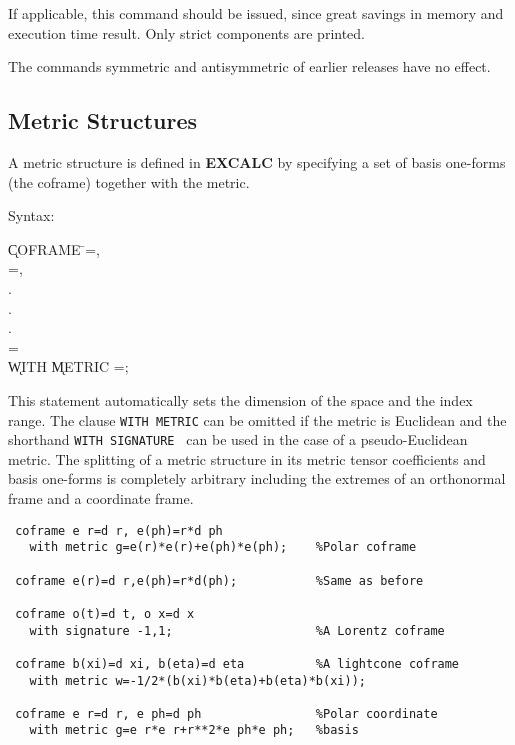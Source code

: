 If applicable, this command should
be issued, since great savings in memory and execution time result.
Only strict components are printed.

The commands symmetric and antisymmetric of earlier releases have no
effect.


\subsection{Metric Structures}

 
A metric structure is defined in {\bf EXCALC} by specifying a set of
basis one-forms (the coframe) together with the metric.

Syntax:\label{COFRAME}

\begin{tabbing}
\hspace*{2em} \k{COFRAME} \=
=, \\
\> =, \\
\> . \\
\> . \\
\> . \\
\> = \\
\> \hspace{1em} \k{WITH} \k{METRIC} =; \\
\end{tabbing}

 
This statement automatically sets the dimension of the space and the
index range. The clause {\tt WITH METRIC} can be omitted if the metric
is Euclidean and the shorthand {\tt WITH SIGNATURE }
\label{SIGNATURE} can be used in the case of a pseudo-Euclidean metric. The
splitting of a metric structure in its metric tensor coefficients and
basis one-forms is completely arbitrary including the extremes of an
orthonormal frame and a coordinate frame.

\example{}

\begin{verbatim}
 coframe e r=d r, e(ph)=r*d ph
   with metric g=e(r)*e(r)+e(ph)*e(ph);    %Polar coframe

 coframe e(r)=d r,e(ph)=r*d(ph);           %Same as before

 coframe o(t)=d t, o x=d x
   with signature -1,1;                    %A Lorentz coframe

 coframe b(xi)=d xi, b(eta)=d eta          %A lightcone coframe
   with metric w=-1/2*(b(xi)*b(eta)+b(eta)*b(xi));

 coframe e r=d r, e ph=d ph                %Polar coordinate
   with metric g=e r*e r+r**2*e ph*e ph;   %basis

\end{verbatim}

